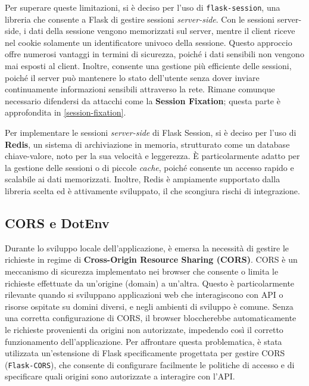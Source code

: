 Per superare queste limitazioni, si è deciso per l'uso di \texttt{flask-session}, una libreria che consente a Flask di gestire sessioni \emph{server-side}. Con le sessioni server-side, i dati della sessione vengono memorizzati sul server, mentre il client riceve nel cookie solamente un identificatore univoco della sessione. Questo approccio offre numerosi vantaggi in termini di sicurezza, poiché i dati sensibili non vengono mai esposti al client. Inoltre, consente una gestione più efficiente delle sessioni, poiché il server può mantenere lo stato dell'utente senza dover inviare continuamente informazioni sensibili attraverso la rete.
Rimane comunque necessario difendersi da attacchi come la \textbf{Session Fixation}; questa parte è approfondita in \ref{session-fixation}.

Per implementare le sessioni \emph{server-side} di Flask Session, si è deciso per l'uso di \textbf{Redis}, un sistema di archiviazione in memoria, strutturato come un database chiave-valore, noto per la sua velocità e leggerezza. È particolarmente adatto per la gestione delle sessioni o di piccole \emph{cache}, poiché consente un accesso rapido e scalabile ai dati memorizzati. Inoltre, Redis è ampiamente supportato dalla libreria scelta ed è attivamente sviluppato, il che scongiura rischi di integrazione.

\subsection{CORS e DotEnv}
Durante lo sviluppo locale dell'applicazione, è emersa la necessità di gestire le richieste in regime di \textbf{Cross-Origin Resource Sharing (CORS)}. CORS è un meccanismo di sicurezza implementato nei browser che consente o limita le richieste effettuate da un'origine (domain) a un'altra. Questo è particolarmente rilevante quando si sviluppano applicazioni web che interagiscono con API o risorse ospitate su domini diversi, e negli ambienti di sviluppo è comune. Senza una corretta configurazione di CORS, il browser bloccherebbe automaticamente le richieste provenienti da origini non autorizzate, impedendo così il corretto funzionamento dell'applicazione. Per affrontare questa problematica, è stata utilizzata un'estensione di Flask specificamente progettata per gestire CORS (\texttt{Flask-CORS}), che consente di configurare facilmente le politiche di accesso e di specificare quali origini sono autorizzate a interagire con l'API.

